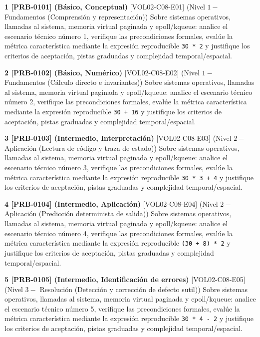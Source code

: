 \documentclass{book}
\begin{document}
\begin{tcolorbox}[title={Ejercicios}, studiumworked, breakable]

\noindent\textbf{1 [PRB-0101] (Básico, Conceptual)}
[VOL02-C08-E01] (Nivel \(1 -\) Fundamentos (Comprensión y representación)) Sobre sistemas operativos, llamadas al sistema, memoria virtual paginada y epoll/kqueue: analice el escenario técnico número 1, verifique las precondiciones formales, evalúe la métrica característica mediante la expresión reproducible \texttt{30 * 2} y justifique los criterios de aceptación, pistas graduadas y complejidad temporal/espacial.

\noindent\textbf{2 [PRB-0102] (Básico, Numérico)}
[VOL02-C08-E02] (Nivel \(1 -\) Fundamentos (Cálculo directo e invariantes)) Sobre sistemas operativos, llamadas al sistema, memoria virtual paginada y epoll/kqueue: analice el escenario técnico número 2, verifique las precondiciones formales, evalúe la métrica característica mediante la expresión reproducible \texttt{30 + 16} y justifique los criterios de aceptación, pistas graduadas y complejidad temporal/espacial.

\noindent\textbf{3 [PRB-0103] (Intermedio, Interpretación)}
[VOL02-C08-E03] (Nivel \(2 -\) Aplicación (Lectura de código y traza de estado)) Sobre sistemas operativos, llamadas al sistema, memoria virtual paginada y epoll/kqueue: analice el escenario técnico número 3, verifique las precondiciones formales, evalúe la métrica característica mediante la expresión reproducible \texttt{30 * 3 + 4} y justifique los criterios de aceptación, pistas graduadas y complejidad temporal/espacial.

\noindent\textbf{4 [PRB-0104] (Intermedio, Aplicación)}
[VOL02-C08-E04] (Nivel \(2 -\) Aplicación (Predicción determinista de salida)) Sobre sistemas operativos, llamadas al sistema, memoria virtual paginada y epoll/kqueue: analice el escenario técnico número 4, verifique las precondiciones formales, evalúe la métrica característica mediante la expresión reproducible \texttt{(30 + 8) * 2} y justifique los criterios de aceptación, pistas graduadas y complejidad temporal/espacial.

\noindent\textbf{5 [PRB-0105] (Intermedio, Identificación de errores)}
[VOL02-C08-E05] (Nivel \(3 -\) Resolución (Detección y corrección de defecto sutil)) Sobre sistemas operativos, llamadas al sistema, memoria virtual paginada y epoll/kqueue: analice el escenario técnico número 5, verifique las precondiciones formales, evalúe la métrica característica mediante la expresión reproducible \texttt{30 * 4 - 2} y justifique los criterios de aceptación, pistas graduadas y complejidad temporal/espacial.


\end{tcolorbox}
\end{document}
